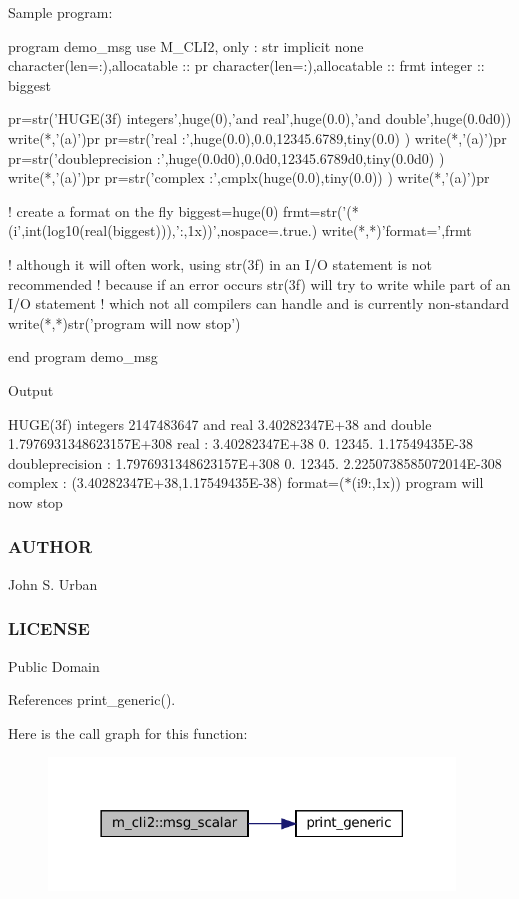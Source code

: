 Sample program\+: \begin{DoxyVerb}  program demo_msg
  use M_CLI2, only : str
  implicit none
  character(len=:),allocatable :: pr
  character(len=:),allocatable :: frmt
  integer                      :: biggest

  pr=str('HUGE(3f) integers',huge(0),'and real',huge(0.0),'and double',huge(0.0d0))
  write(*,'(a)')pr
  pr=str('real            :',huge(0.0),0.0,12345.6789,tiny(0.0) )
  write(*,'(a)')pr
  pr=str('doubleprecision :',huge(0.0d0),0.0d0,12345.6789d0,tiny(0.0d0) )
  write(*,'(a)')pr
  pr=str('complex         :',cmplx(huge(0.0),tiny(0.0)) )
  write(*,'(a)')pr

  ! create a format on the fly
  biggest=huge(0)
  frmt=str('(*(i',int(log10(real(biggest))),':,1x))',nospace=.true.)
  write(*,*)'format=',frmt

  ! although it will often work, using str(3f) in an I/O statement is not recommended
  ! because if an error occurs str(3f) will try to write while part of an I/O statement
  ! which not all compilers can handle and is currently non-standard
  write(*,*)str('program will now stop')

  end program demo_msg
\end{DoxyVerb}


Output

H\+U\+G\+E(3f) integers 2147483647 and real 3.\+40282347E+38 and double 1.\+7976931348623157E+308 real \+: 3.\+40282347E+38 0. 12345. 1.\+17549435E-\/38 doubleprecision \+: 1.\+7976931348623157E+308 0. 12345. 2.\+2250738585072014E-\/308 complex \+: (3.\+40282347E+38,1.\+17549435E-\/38) format=($\ast$(i9\+:,1x)) program will now stop

\subsubsection*{A\+U\+T\+H\+OR}

John S. Urban \subsubsection*{L\+I\+C\+E\+N\+SE}

Public Domain 

References print\+\_\+generic().

Here is the call graph for this function\+:
\nopagebreak
\begin{figure}[H]
\begin{center}
\leavevmode
\includegraphics[width=306pt]{namespacem__cli2_a737dc863a63dc101338840baad1cfd17_cgraph}
\end{center}
\end{figure}
\mbox{\label{namespacem__cli2_a0e44d7c9058545df8bf09674e9c2e799}} 
